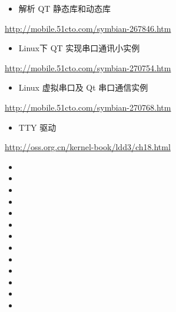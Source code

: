 \documentclass[9pt,b5paper]{article}
\begin{document}
\begin{itemize}
\item 解析 QT 静态库和动态库
\end{itemize}
\url{http://mobile.51cto.com/symbian-267846.htm}
\begin{itemize}
\item Linux下 QT 实现串口通讯小实例
\end{itemize}
\url{http://mobile.51cto.com/symbian-270754.htm}
\begin{itemize}
\item Linux 虚拟串口及 Qt 串口通信实例
\end{itemize}
\url{http://mobile.51cto.com/symbian-270768.htm}
\begin{itemize}
\item TTY 驱动
\end{itemize}
\url{http://oss.org.cn/kernel-book/ldd3/ch18.html}
\begin{itemize}
\item 
\item 
\item 
\item 
\item 
\item 
\item 
\item 
\item 
\item 
\item 
\item 
\item 
\end{itemize}
\end{document}
